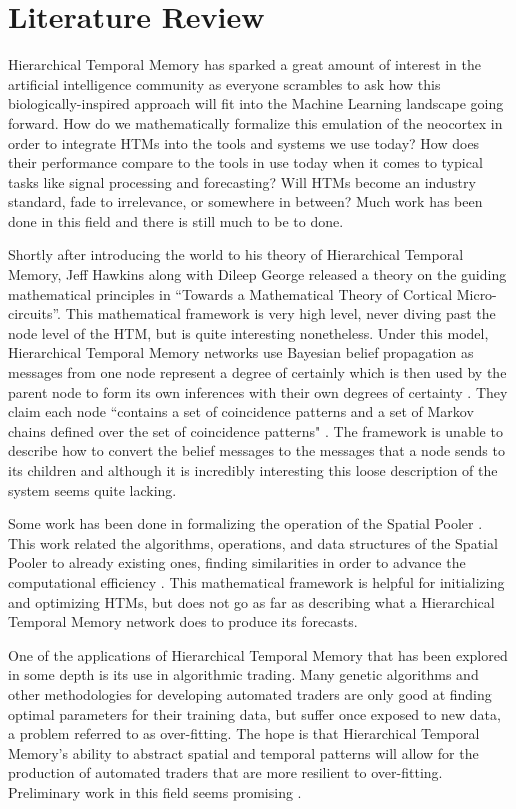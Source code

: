 \documentclass[fleqn,notitlepage,minimal]{article}
\begin{document}
	
	
	\section{Literature Review}
	
	Hierarchical Temporal Memory has sparked a great amount of interest in the artificial intelligence community as everyone scrambles to ask how this biologically-inspired approach will fit into the Machine Learning landscape going forward. How do we mathematically formalize this emulation of the neocortex in order to integrate HTMs into the tools and systems we use today? How does their performance compare to the tools in use today when it comes to typical tasks like signal processing and forecasting? Will HTMs become an industry standard, fade to irrelevance, or somewhere in between? Much work has been done in this field and there is still much to be to done.
	
	Shortly after introducing the world to his theory of Hierarchical Temporal Memory, Jeff Hawkins along with Dileep George released a theory on the guiding mathematical principles in ``Towards a Mathematical Theory of Cortical Micro-circuits''. This mathematical framework is very high level, never diving past the node level of the HTM, but is quite interesting nonetheless. Under this model, Hierarchical Temporal Memory networks use Bayesian belief propagation as messages from one node represent a degree of certainly which is then used by the parent node to form its own inferences with their own degrees of certainty \cite{Towards}. They claim each node ``contains a set of coincidence patterns and a set of Markov chains defined over the set of coincidence patterns" \cite{Towards}. The framework is unable to describe how to convert the belief messages to the messages that a node sends to its children and although it is incredibly interesting this loose description of the system seems quite lacking.
	
	Some work has been done in formalizing the operation of the Spatial Pooler \cite{Framework}. This work related the algorithms, operations, and data structures of the Spatial Pooler to already existing ones, finding similarities in order to advance the computational efficiency \cite{Framework}. This mathematical framework is helpful for initializing and optimizing HTMs, but does not go as far as describing what a Hierarchical Temporal Memory network does to produce its forecasts.
	
	One of the applications of Hierarchical Temporal Memory that has been explored in some depth is its use in algorithmic trading. Many genetic algorithms and other methodologies for developing automated traders are only good at finding optimal parameters for their training data, but suffer once exposed to new data, a problem referred to as over-fitting. The hope is that Hierarchical Temporal Memory's ability to abstract spatial and temporal patterns will allow for the production of automated traders that are more resilient to over-fitting. Preliminary work in this field seems promising \cite{Evaluation}.
	
\end{document}
